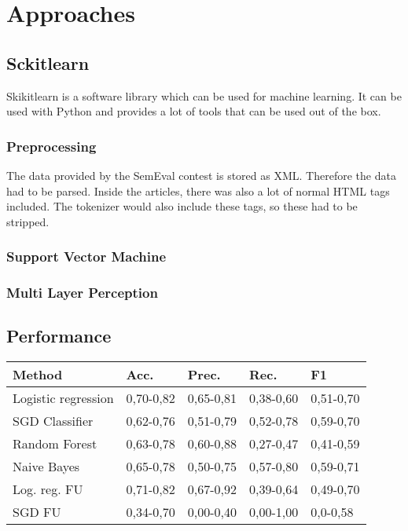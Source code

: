 \section{Approaches}

\subsection{Sckitlearn}

Skikitlearn is a software library which can be used for machine learning. It can be used with Python and provides a lot of tools that can be used out of the box.

\subsubsection{Preprocessing}
The data provided by the SemEval contest is stored as XML. Therefore the data had to be parsed. Inside the articles, there was also a lot of normal HTML tags included. The tokenizer would also include these tags, so these had to be stripped. 

\subsubsection{Support Vector Machine}

\subsubsection{Multi Layer Perception}

\subsection{Performance}
 

\begin{tabular}{ l | l l l l }
	Method & Acc. & Prec. & Rec. & F1 \\
	\hline
	Logistic regression & 0,70-0,82 & 0,65-0,81 & 0,38-0,60 & 0,51-0,70 \\
	SGD Classifier & 0,62-0,76 & 0,51-0,79 & 0,52-0,78 & 0,59-0,70 \\
	Random Forest & 0,63-0,78 & 0,60-0,88 & 0,27-0,47 & 0,41-0,59 \\
	Naive Bayes & 0,65-0,78 & 0,50-0,75 & 0,57-0,80 & 0,59-0,71 \\
	Log. reg. FU & 0,71-0,82 & 0,67-0,92 & 0,39-0,64 & 0,49-0,70 \\
	SGD FU & 0,34-0,70 & 0,00-0,40 & 0,00-1,00 & 0,0-0,58 \\
\end{tabular}
